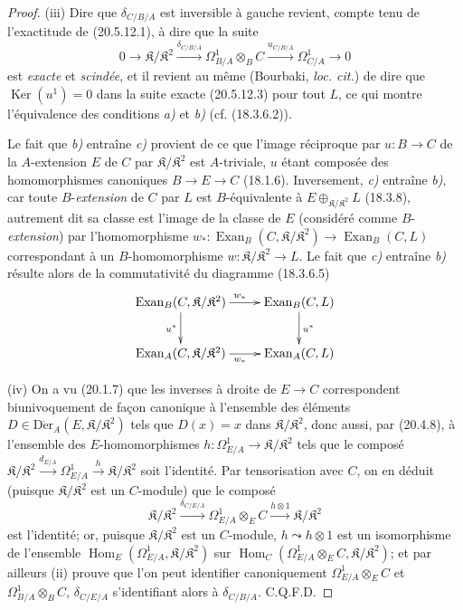 \begin{proof}
\medskip
(iii) Dire que $\delta_{C/B/A}$ est inversible à gauche revient, compte
tenu de l'exactitude de (20.5.12.1), à dire que la suite
\begin{equation}
\tag{20.5.12.5}
\label{0.20.5.12.5-fr}
  0\longrightarrow\mathfrak{K}/\mathfrak{K}^2
  \xrightarrow{\delta_{C/B/A}}\Omega^1_{B/A}\otimes_B C
  \xrightarrow{u_{C/B/A}}\Omega^1_{C/A}\longrightarrow0
\end{equation}
est \emph{exacte} et \emph{scindée}, et il revient au même (Bourbaki,
\emph{loc. cit.}) de dire que $\operatorname{Ker}(u^1)=0$ dans la suite exacte
(20.5.12.3) pour tout $L$, ce qui montre l'équivalence des conditions
\emph{a)} et \emph{b)} (cf. (18.3.6.2)).

Le fait que \emph{b)} entraîne \emph{c)} provient de ce que l'image réciproque par
$u:B\to C$ de la $A$-extension $E$ de $C$ par
$\mathfrak{K}/\mathfrak{K}^2$ est $A$-triviale, $u$ étant composée des
homomorphismes canoniques $B\to E\to C$ (18.1.6). Inversement, \emph{c)}
entraîne \emph{b)}, car toute $B$-\emph{extension} de $C$ par $L$ est $B$-équivalente
à $E\oplus_{\mathfrak{K}/\mathfrak{K}^2}L$ (18.3.8), autrement dit sa
classe est l'image de la classe de $E$ (considéré comme $B$-\emph{extension})
par l'homomorphisme
$w_*:\operatorname{Exan}_B(C,\mathfrak{K}/\mathfrak{K}^2)
\to\operatorname{Exan}_B(C,L)$ correspondant à un $B$-homomorphisme
$w:\mathfrak{K}/\mathfrak{K}^2\to L$. Le fait que \emph{c)} entraîne \emph{b)} résulte
alors de la commutativité du diagramme (18.3.6.5)
\[
\xymatrix{
  \operatorname{Exan}_B(C,\mathfrak{K}/\mathfrak{K}^2)
    \ar[r]^{w_*} \ar[d]_{u^*} &
  \operatorname{Exan}_B(C,L) \ar[d]^{u^*} \\
  \operatorname{Exan}_A(C,\mathfrak{K}/\mathfrak{K}^2)
    \ar[r]_{w_*} & \operatorname{Exan}_A(C,L)
}
\]

\medskip
(iv) On a vu (20.1.7) que les inverses à droite de $E\to C$
correspondent biunivoquement de façon canonique à l'ensemble des éléments
$D\in\operatorname{D\acute{e}r}_A(E,\mathfrak{K}/\mathfrak{K}^2)$ tels que $D(x)=x$ dans
$\mathfrak{K}/\mathfrak{K}^2$, donc aussi, par (20.4.8), à l'ensemble des
$E$-homomorphismes
$h:\Omega^1_{E/A}\to\mathfrak{K}/\mathfrak{K}^2$ tels que le composé
$\mathfrak{K}/\mathfrak{K}^2\xrightarrow{d_{E/A}}\Omega^1_{E/A}\xrightarrow{h}\mathfrak{K}/\mathfrak{K}^2$
soit l'identité. Par tensorisation avec $C$, on en déduit (puisque
$\mathfrak{K}/\mathfrak{K}^2$ est un $C$-module) que le composé
\[
  \mathfrak{K}/\mathfrak{K}^2\xrightarrow{\delta_{C/E/A}}
  \Omega^1_{E/A}\otimes_E C\xrightarrow{h\otimes1}
  \mathfrak{K}/\mathfrak{K}^2
\]
est l'identité; or, puisque $\mathfrak{K}/\mathfrak{K}^2$ est un
$C$-module, $h\leadsto h\otimes1$ est un isomorphisme de l'ensemble
$\operatorname{Hom}_E(\Omega^1_{E/A},\mathfrak{K}/\mathfrak{K}^2)$ sur
$\operatorname{Hom}_C(\Omega^1_{E/A}\otimes_E C,\mathfrak{K}/\mathfrak{K}^2)$; et par
ailleurs (ii) prouve que l'on peut identifier canoniquement
$\Omega^1_{E/A}\otimes_E C$ et $\Omega^1_{B/A}\otimes_B C$,
$\delta_{C/E/A}$ s'identifiant alors à $\delta_{C/B/A}$. C.Q.F.D.
\end{proof}

